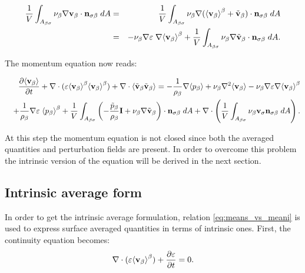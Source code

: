 \begin{eqnarray}
\dfrac{1}{V} \int_{A_{\beta \sigma}} \nu_{\beta} \nabla \textbf{v}_{\beta} \cdot \mathbf{n}_{\sigma \beta} \;dA &=& \dfrac{1}{V} \int_{A_{\beta \sigma}} \nu_{\beta} \nabla ({\left< \textbf{v}_{\beta} \right>}^{\beta} +\tilde{\textbf{v}}_{\beta}) \cdot \mathbf{n}_{\sigma \beta} \;dA   \nonumber \\
&=& - \nu_{\beta} \nabla \varepsilon \; \nabla {\left< \textbf{v}_{\beta}\right>}^{\beta} + \dfrac{1}{V} \int_{A_{\beta \sigma}} \nu_{\beta} \nabla \tilde{\textbf{v}}_{\beta} \cdot \mathbf{n}_{\sigma \beta} \;dA.
\end{eqnarray}


\noindent The momentum equation now reads:

\begin{eqnarray}
&&\dfrac{\partial {\left< \textbf{v}_{\beta}\right>}}{\partial t} + \nabla \cdot (\varepsilon {\left< \textbf{v}_{\beta}\right>}^{\beta}{\left< \textbf{v}_{\beta} \right>}^{\beta}) + \nabla \cdot {\left< \tilde{\textbf{v}}_{\beta}\tilde{\textbf{v}}_{\beta}\right>} = -\dfrac{1}{\rho_{\beta}} \nabla {\left< p_{\beta}\right>} + \nu_{\beta}\nabla^2 {\left< \textbf{v}_{\beta} \right>}  - \nu_{\beta} \nabla \varepsilon \nabla {\left< \textbf{v}_{\beta}\right>}^{\beta}  \nonumber \\
&&+\dfrac{1}{\rho_{\beta}}\nabla\varepsilon \; {\left< p_{\beta} \right>}^{\beta} +\dfrac{1}{V} \displaystyle\int_{A_{\beta \sigma}} \left( -\dfrac{\tilde{p}_{\beta}}{\rho_{\beta}} \mathbf{I} + \nu_{\beta} \nabla \tilde{\textbf{v}}_{\beta}  \right)\cdot \mathbf{n}_{\sigma \beta} \;dA + \nabla \cdot \left( \dfrac{1}{V} \int_{A_{\beta \sigma}}  \nu_{\beta} \textbf{v}_{\sigma} \mathbf{n}_{\sigma \beta} \;dA \right).  \nonumber \\
\label{eq:NS_2}
\end{eqnarray}

At this step the momentum equation is not closed since both the averaged quantities and perturbation fields are present.
In order to overcome this problem the intrinsic version of the equation will be derived in the next section.

\subsection{Intrinsic average form}
In order to get the intrinsic average formulation, relation \eqref{eq:means_vs_meani} is used to express surface averaged quantities in terms of intrinsic ones. First, the continuity equation becomes:
$$
\nabla \cdot (\varepsilon{\left< \textbf{v}_{\beta}\right>}^{\beta} ) + \dfrac{\partial \varepsilon}{\partial t}= 0.
$$

